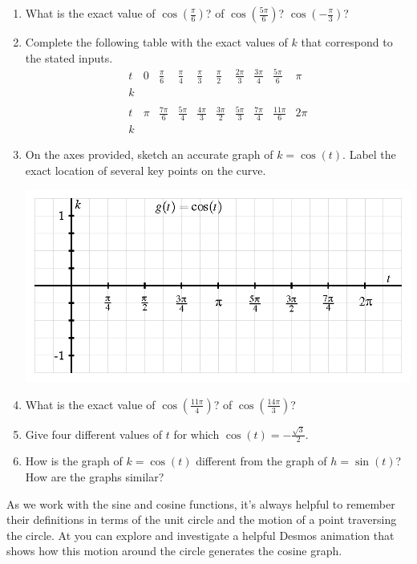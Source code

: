 \documentclass[nooutcomes]{ximera}
\begin{document}
\begin{exploration}
\begin{enumerate}[label=\alph*.]
\item What is the exact value of \(\cos\left(\frac{\pi}{6}\right)\)?  of \(\cos\left(\frac{5\pi}{6}\right)\)? \(\cos\left(-\frac{\pi}{3}\right)\)?
\item Complete the following table with the exact values of \(k\) that correspond to the stated inputs.
\[
\begin{array}{llllllllll}
t&0&\frac{\pi}{6}&\frac{\pi}{4}&\frac{\pi}{3}&\frac{\pi}{2}&\frac{2\pi}{3}&\frac{3\pi}{4}&\frac{5\pi}{6}&\pi\\
\hline
k&&&&&&&&&\\
&&&&&&&&&\\
t&\pi&\frac{7\pi}{6}&\frac{5\pi}{4}&\frac{4\pi}{3}&\frac{3\pi}{2}&\frac{5\pi}{3}&\frac{7\pi}{4}&\frac{11\pi}{6}&2\pi\\
\hline
k&&&&&&&&&
\end{array}
\]
\item On the axes provided, sketch an accurate graph of \(k = \cos(t)\).  Label the exact location of several key points on the curve.
\begin{image}
\includegraphics{sine-cosine-definition-axes.png}
\end{image}
\item What is the exact value of \(\cos\left( \frac{11\pi}{4} \right)\)? of \(\cos\left( \frac{14\pi}{3} \right)\)?
\item Give four different values of \(t\) for which \(\cos(t) = -\frac{\sqrt{3}}{2}\).
\item How is the graph of \(k = \cos(t)\) different from the graph of \(h = \sin(t)\)?  How are the graphs similar?
\end{enumerate}

\end{exploration}

As we work with the sine and cosine functions, it's always helpful to remember their definitions in terms of the unit circle and the motion of a point traversing the circle.  At  you can explore and investigate a helpful Desmos animation that shows how this motion around the circle generates the cosine graph.
\end{document}

